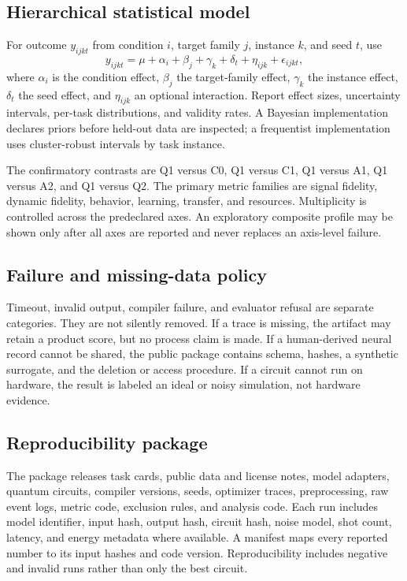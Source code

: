 \documentclass[conference]{IEEEtran}
\begin{document}
\subsection{Hierarchical statistical model}

For outcome $y_{ijkt}$ from condition $i$, target family $j$, instance $k$, and seed
$t$, use
\begin{equation}
y_{ijkt}=\mu+\alpha_i+\beta_j+\gamma_k+\delta_t+\eta_{ijk}+\epsilon_{ijkt},
\label{eq:hierarchical}
\end{equation}
where $\alpha_i$ is the condition effect, $\beta_j$ the target-family effect,
$\gamma_k$ the instance effect, $\delta_t$ the seed effect, and $\eta_{ijk}$ an
optional interaction. Report effect sizes, uncertainty intervals, per-task distributions,
and validity rates. A Bayesian implementation declares priors before held-out data are
inspected; a frequentist implementation uses cluster-robust intervals by task instance.

The confirmatory contrasts are Q1 versus C0, Q1 versus C1, Q1 versus A1, Q1 versus A2,
and Q1 versus Q2. The primary metric families are signal fidelity, dynamic fidelity,
behavior, learning, transfer, and resources. Multiplicity is controlled across the
predeclared axes. An exploratory composite profile may be shown only after all axes are
reported and never replaces an axis-level failure.

\subsection{Failure and missing-data policy}

Timeout, invalid output, compiler failure, and evaluator refusal are separate categories.
They are not silently removed. If a trace is missing, the artifact may retain a product
score, but no process claim is made. If a human-derived neural record cannot be shared,
the public package contains schema, hashes, a synthetic surrogate, and the deletion or
access procedure. If a circuit cannot run on hardware, the result is labeled an ideal or
noisy simulation, not hardware evidence.

\subsection{Reproducibility package}

The package releases task cards, public data and license notes, model adapters, quantum
circuits, compiler versions, seeds, optimizer traces, preprocessing, raw event logs,
metric code, exclusion rules, and analysis code. Each run includes model identifier,
input hash, output hash, circuit hash, noise model, shot count, latency, and energy
metadata where available. A manifest maps every reported number to its input hashes and
code version. Reproducibility includes negative and invalid runs rather than only the
best circuit.
\end{document}
